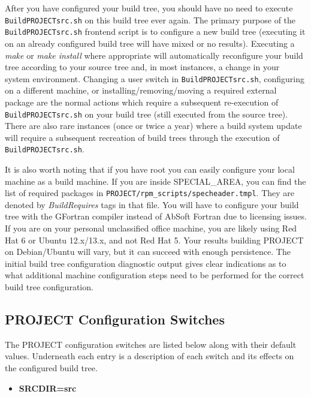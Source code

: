 \documentclass[12pt,letterpaper]{article}
\begin{document}
After you have configured your build tree, you should have no need to execute \verb|BuildPROJECTsrc.sh| on this build tree ever again.  The primary purpose of the \verb|BuildPROJECTsrc.sh| frontend script is to configure a new build tree (executing it on an already configured build tree will have mixed or no results).  Executing a \emph{make} or \emph{make install} where appropriate will automatically reconfigure your build tree according to your source tree and, in most instances, a change in your system environment.  Changing a user switch in \verb|BuildPROJECTsrc.sh|, configuring on a different machine, or installing/removing/moving a required external package are the normal actions which require a subsequent re-execution of \verb|BuildPROJECTsrc.sh| on your build tree (still executed from the source tree).  There are also rare instances (once or twice a year) where a build system update will require a subsequent recreation of build trees through the execution of \verb|BuildPROJECTsrc.sh|.

It is also worth noting that if you have root you can easily configure your local machine as a build machine.  If you are inside SPECIAL_AREA, you can find the list of required packages in \verb|PROJECT/rpm_scripts/specheader.tmpl|.  They are denoted by \emph{BuildRequires} tags in that file.  You will have to configure your build tree with the GFortran compiler instead of AbSoft Fortran due to licensing issues.  If you are on your personal unclassified office machine, you are likely using Red Hat 6 or Ubuntu 12.x/13.x, and not Red Hat 5.  Your results building PROJECT on Debian/Ubuntu will vary, but it can succeed with enough persistence.  The initial build tree configuration diagnostic output gives clear indications as to what additional machine configuration steps need to be performed for the correct build tree configuration.

\subsection{PROJECT Configuration Switches}\hypertarget{configswitches}{}

The PROJECT configuration switches are listed below along with their default values.  Underneath each entry is a description of each switch and its effects on the configured build tree.

\begin{itemize}
\item \textbf{SRCDIR=src}
\end{itemize}
\end{document}
